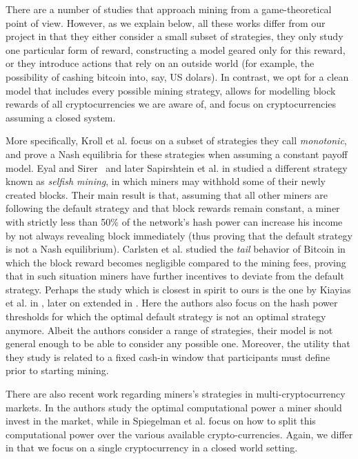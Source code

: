 There are a number of studies that approach mining from a game-theoretical point of view. However, as we explain below, all these works 
differ from our project in that they either consider a small subset of strategies, they only study one particular form of reward, constructing a model geared only for this reward, 
or they introduce actions that rely on an outside world (for example, the possibility of cashing bitcoin into, say, US dolars). In contrast, we opt for a clean model that includes every possible mining strategy, allows for modelling block rewards of all cryptocurrencies we are aware of, and focus on cryptocurrencies assuming a closed system. 

More specifically,  Kroll et al. \cite{economics_of_mining2013} focus on a subset of strategies they call \emph{monotonic}, and prove a 
Nash equilibria for these strategies when assuming a constant payoff model. Eyal and Sirer~\cite{selfishmining2014}  and later Sapirshtein et al. in \cite{optimalselfishmining2017} studied a different strategy known as \emph{selfish mining}, in which miners may withhold some of their newly created blocks. Their main result is that, assuming that all other miners are following the default strategy and that block rewards remain constant, a miner with strictly less than 50\% of the network's hash power can increase his income by not always revealing block immediately (thus proving that the default strategy is not a Nash equilibrium). Carlsten et al. \cite{instabilitywithoutreward:2016} studied the \emph{tail} behavior of Bitcoin in which the block reward becomes negligible compared to the mining fees, proving that in such situation miners have further incentives to deviate from the default strategy. 
Perhaps the study which is closest in spirit to ours is the one by Kiayias et al. in \cite{mininggames:2016}, later on extended in \cite{koutsoupias2018blockchain}. Here the authors 
also focus on the hash power thresholds for which the optimal default strategy is not an optimal strategy anymore. Albeit the authors consider a range of strategies, their model is not general enough to be able to consider any possible one. Moreover, the utility that they study is related to a fixed cash-in window that participants must define prior to starting mining. 

There are also recent work regarding miners's strategies in multi-cryptocurrency markets. In \cite{dhamal2018stochastic} the authors study the optimal computational power a miner should invest in the market, while in \cite{spiegelman2018game} Spiegelman et al. focus on how to split this computational power over the various available crypto-currencies. Again, we differ in that we focus on a single cryptocurrency in a closed world setting.
